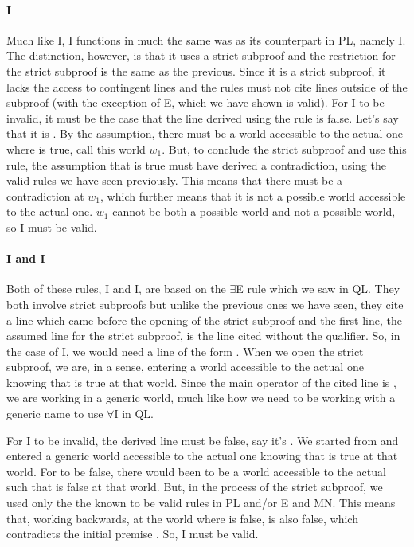 \paragraph{\ebox\enot I}
Much like \ebox\eif I, \ebox\enot I functions in much the same was as its counterpart in PL, namely \enot I. The distinction, however, is that it uses a strict subproof and the restriction for the strict subproof is the same as the previous. Since it is a strict subproof, it lacks the access to contingent lines and the rules must not cite lines outside of the subproof (with the exception of \ebox E, which we have shown is valid). For \ebox\enot I to be invalid, it must be the case that the line derived using the rule is false. Let's say that it is \ebox\enot{}. By the assumption, there must be a world accessible to the actual one where  is true, call this world $w_1$. But, to conclude the strict subproof and use this rule, the assumption that  is true must have derived a contradiction, using the valid rules we have seen previously. This means that there must be a contradiction at $w_1$, which further means that it is not a possible world accessible to the actual one. $w_1$ cannot be both a possible world and not a possible world, so \ebox\enot I must be valid. 

\paragraph{\ebox I and \ediamond I}
Both of these rules, \ebox I and \ediamond I, are based on the $\exists$E rule which we saw in QL. They both involve strict subproofs but unlike the previous ones we have seen, they cite a line which came before the opening of the strict subproof and the first line, the assumed line for the strict subproof, is the line cited without the qualifier. So, in the case of \ebox I, we would need a line of the form \ebox{}. When we open the strict subproof, we are, in a sense, entering a world accessible to the actual one knowing that  is true at that world. Since the main operator of the cited line is \ebox, we are working in a generic world, much like how we need to be working with a generic name to use $\forall$I in QL. 

For \ebox I to be invalid, the derived line must be false, say it's \ebox{}. We started from \ebox{} and entered a generic world accessible to the actual one knowing that  is true at that world. For \ebox{} to be false, there would been to be a world accessible to the actual such that  is false at that world. But, in the process of the strict subproof, we used only the the known to be valid rules in PL and/or  \ebox E and MN. This means that, working backwards, at the world where  is false,  is also false, which contradicts the initial premise \ebox{}. So, \ebox I must be valid. 

